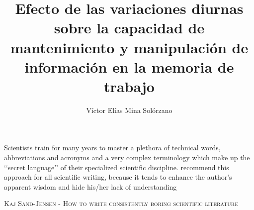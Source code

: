 \documentclass[12pt,letterpaper,final]{article}
\begin{document}
\renewcommand{\BOthers}[1]{et al.\hbox{}}
	{
\selectfont
}
\title{Efecto de las variaciones diurnas sobre la capacidad de mantenimiento y manipulación de información en la memoria de trabajo}
\author{Víctor Elías Mina Solórzano}
\city{}
\degreeyear{\the\year}

\maketitle

\begin{dedication}
Scientists train for many years to master a plethora of technical words, abbreviations and acronyms and a
very complex terminology which make up the ‘‘secret language’’ of their specialized scientific discipline. recommend this approach for all scientific writing,
because it tends to enhance the author’s apparent wisdom and hide his/her lack of understanding

\textsc{Kaj Sand-Jensen - How to write consistently boring scientific literature }
\end{dedication}
\end{document}
